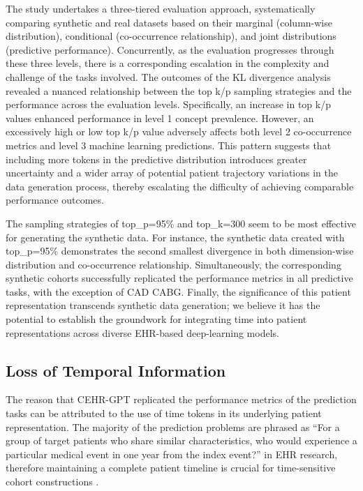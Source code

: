 \begin{multicols}{2}
The study undertakes a three-tiered evaluation approach, systematically comparing synthetic and real datasets based on their marginal (column-wise distribution), conditional (co-occurrence relationship), and joint distributions (predictive performance). Concurrently, as the evaluation progresses through these three levels, there is a corresponding escalation in the complexity and challenge of the tasks involved. The outcomes of the KL divergence analysis revealed a nuanced relationship between the top k/p sampling strategies and the performance across the evaluation levels. Specifically, an increase in top k/p values enhanced performance in level 1 concept prevalence. However, an excessively high or low top k/p value adversely affects both level 2 co-occurrence metrics and level 3 machine learning predictions. This pattern suggests that including more tokens in the predictive distribution introduces greater uncertainty and a wider array of potential patient trajectory variations in the data generation process, thereby escalating the difficulty of achieving comparable performance outcomes.

The sampling strategies of top\_p=95\% and top\_k=300 seem to be most effective for generating the synthetic data. For instance, the synthetic data created with top\_p=95\% demonstrates the second smallest divergence in both dimension-wise distribution and co-occurrence relationship. Simultaneously, the corresponding synthetic cohorts successfully replicated the performance metrics in all predictive tasks, with the exception of CAD CABG. Finally, the significance of this patient representation transcends synthetic data generation; we believe it has the potential to establish the groundwork for integrating time into patient representations across diverse EHR-based deep-learning models.

\subsection{Loss of Temporal Information}
The reason that CEHR-GPT replicated the performance metrics of the prediction tasks can be attributed to the use of time tokens in its underlying patient representation. The majority of the prediction problems are phrased as “For a group of target patients who share similar characteristics, who would experience a particular medical event in one year from the index event?” in EHR research, therefore maintaining a complete patient timeline is crucial for time-sensitive cohort constructions \cite{ohdsi2019book}.


\end{multicols}
